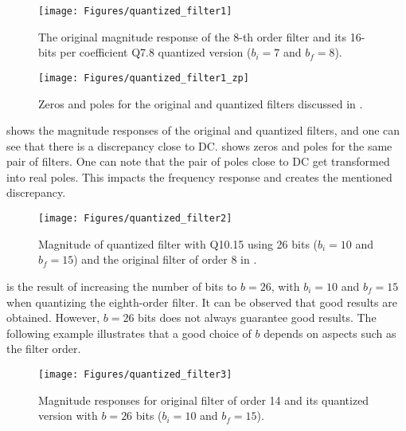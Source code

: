 \begin{figure}
\centering
\texttt{[image: Figures/quantized\_filter1]}
\caption{The original magnitude response of the 8-th order filter and its 16-bits per coefficient Q7.8 quantized version ($b_i=7$ and $b_f=8$).\label{fig:quantized_filter1}}
\end{figure}

\begin{figure}
\centering
\texttt{[image: Figures/quantized\_filter1\_zp]}
\caption{Zeros and poles for the original and quantized filters discussed in .\label{fig:quantized_filter1_zp}}
\end{figure}


 shows the magnitude responses of the original and quantized filters, and one can see that there is a discrepancy close to DC.
 shows zeros and poles for the same pair of filters. One can note that the pair of poles close to DC get transformed into real poles. This impacts the frequency response and creates the mentioned discrepancy.

\begin{figure}
\centering
\texttt{[image: Figures/quantized\_filter2]}
\caption{Magnitude of quantized filter with Q10.15 using 26 bits ($b_i=10$ and $b_f=15$) and the original filter of order 8 in .\label{fig:quantized_filter2}}
\end{figure}

%

 is the result of increasing the number of bits to $b=26$, with $b_i=10$ and $b_f=15$ when quantizing the eighth-order filter. It can be observed that good results are obtained. However, $b=26$ bits does not always guarantee good results. The following example illustrates that a good choice of $b$ depends on aspects such as the filter order.

\begin{figure}
\centering
\texttt{[image: Figures/quantized\_filter3]}
\caption{Magnitude responses for original filter of order 14 and its quantized version with $b=26$ bits ($b_i=10$ and $b_f=15$).\label{fig:quantized_filter3}}
\end{figure}


